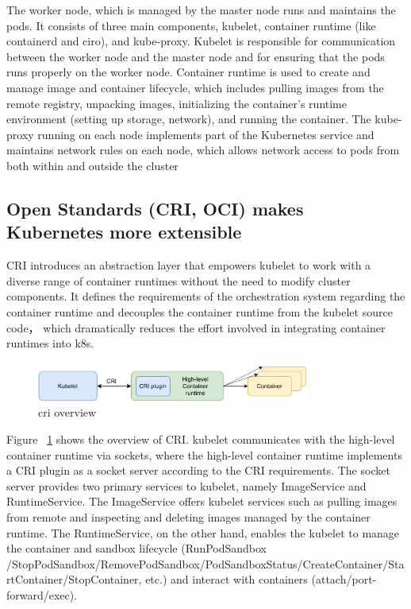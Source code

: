 The worker node, which is managed by the master node runs and maintains the pods. It consists of three main components, kubelet, container runtime (like containerd\cite*{containerd} and ciro\cite*{cri-o}), and kube-proxy. Kubelet is responsible for communication between the 
worker node and the master node and for ensuring that the pods runs properly on the worker node. Container runtime is used to create and manage image and  container lifecycle, which includes pulling images from the remote registry, unpacking images, 
initializing the container's runtime environment (setting up storage, network), and running the container. The kube-proxy running on each node implements part of the Kubernetes service and maintains network rules on each node, which allows 
network access to pods from both within and outside the cluster

\subsection{Open Standards (CRI\cite*{cri-interface}, OCI\cite*{oci-spec}) makes Kubernetes more extensible}

CRI introduces an abstraction layer that empowers kubelet to work with a diverse range of container runtimes without the need to modify cluster components. It defines the requirements of the 
orchestration system regarding the container runtime and decouples the container runtime from the kubelet source code， which dramatically reduces the effort involved in integrating container 
runtimes into k8s\cite*{cri-interface}.

\begin{figure}[H]
    \centering
    \includegraphics[width=0.8\textwidth]{images/cri_overviwe.pdf}
    \caption[cri overview]{cri overview}
    \label{fig:cri_overviwe}
  \end{figure}


Figure ~\ref{fig:cri_overviwe} shows the overview of CRI. kubelet communicates with the high-level container runtime via sockets, where the high-level container runtime implements a CRI plugin as a socket server according to the CRI 
requirements. The socket server provides two primary services to kubelet, namely ImageService and RuntimeService. The ImageService offers kubelet services such as pulling images from remote and 
inspecting and deleting images managed by the container runtime. The RuntimeService, on the other hand, enables the kubelet to manage the container and sandbox lifecycle 
(RunPodSandbox /StopPodSandbox/RemovePodSandbox/PodSandboxStatus/CreateContainer/StartContainer/StopContainer, etc.) 
and interact with containers (attach/port-forward/exec)\cite*{cri-interface}.

